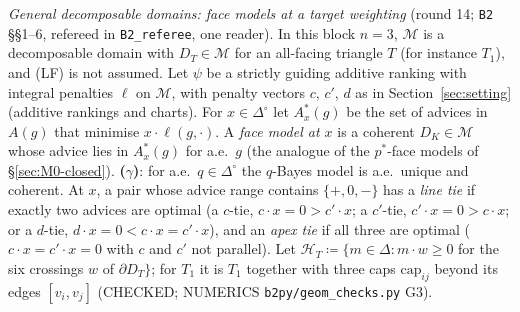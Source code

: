 \documentclass[11pt]{article}
\theoremstyle{definition}
\theoremstyle{remark}
\newcommand{\Di}{\Delta^{\circ}}
\newcommand{\M}{\mathcal M}
\newcommand{\src}[1]{\texttt{#1}}
\begin{document}
\emph{General decomposable domains: face models at a target weighting} (round 14; \src{B2} \S\S1--6, refereed in \src{B2\_referee}, one reader). In this block $n=3$, $\M$ is a decomposable domain with $D_T\in\M$ for an all-facing triangle $T$ (for instance $T_1$), and (LF) is not assumed. Let $\psi$ be a strictly guiding additive ranking with integral penalties $\ell$ on $\M$, with penalty vectors $c$, $c'$, $d$ as in Section~\ref{sec:setting} (additive rankings and charts). For $x\in\Di$ let $A^*_x(g)$ be the set of advices in $A(g)$ that minimise $x\cdot\ell(g,\cdot)$. A \emph{face model at $x$} is a coherent $D_K\in\M$ whose advice lies in $A^*_x(g)$ for a.e.\ $g$ (the analogue of the $p^*$-face models of \S\ref{sec:M0-closed}). \textbf{($\gamma$)}: for a.e.\ $q\in\Di$ the $q$-Bayes model is a.e.\ unique and coherent. At $x$, a pair whose advice range contains $\{+,0,-\}$ has a \emph{line tie} if exactly two advices are optimal (a $c$-tie, $c\cdot x=0>c'\cdot x$; a $c'$-tie, $c'\cdot x=0>c\cdot x$; or a $d$-tie, $d\cdot x=0<c\cdot x=c'\cdot x$), and an \emph{apex tie} if all three are optimal ($c\cdot x=c'\cdot x=0$ with $c$ and $c'$ not parallel). Let $\mathcal H_T\coloneqq\{m\in\Delta:m\cdot w\ge0$ for the six crossings $w$ of $\partial D_T\}$; for $T_1$ it is $T_1$ together with three caps $\mathrm{cap}_{ij}$ beyond its edges $[v_i,v_j]$ (CHECKED; NUMERICS \src{b2py/geom\_checks.py} G3).
\end{document}
